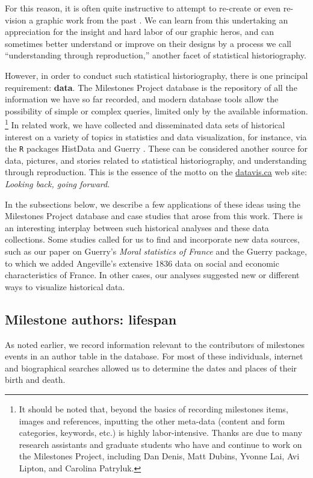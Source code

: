 For this reason, it is often quite instructive to attempt to re-create or even re-vision a graphic work from the past \citep{Friendly:02:Minard}. 
We can learn from this undertaking an appreciation for the insight and hard labor of our graphic heros, and can sometimes better understand 
or improve on their designs by a process we call ``understanding through reproduction,'' another facet of statistical historiography.



However, in order to conduct such statistical historiography, there is one principal requirement: \textbf{data}. 
The Milestones Project database is the repository of all the information we have so far recorded, and modern database tools 
allow the possibility of simple or complex queries, limited only by the available information.%
\footnote{It should be noted that, beyond the basics of recording milestones items, images and references, 
inputting the other meta-data (content and form categories, keywords, etc.) is highly labor-intensive. 
Thanks are due to many research assistants and graduate students who have and continue to work on the Milestones Project, 
including Dan Denis, Matt Dubins, Yvonne Lai, Avi Lipton, and Carolina Patryluk.}
In related work, we have collected and disseminated data sets of historical interest on a variety of topics in statistics and data visualization, 
for instance, via the \texttt{R} packages HistData \citep{HistData} and Guerry \citep{Guerry}. 
These can be considered another source for data, pictures, and stories related to statistical historiography, and understanding through reproduction. 
This is the essence of the motto on the \url{datavis.ca} web site: \emph{Looking back, going forward}.

In the subsections below, we describe a few applications of these ideas using the Milestones Project database and case studies 
that arose from this work. 
There is an interesting interplay between such historical analyses and these data collections. 
Some studies called for us to find and incorporate new data sources, such as our paper \citep{Friendly:2007:guerry} 
on Guerry's \emph{Moral statistics of France} and the Guerry package, to which we added Angeville's extensive 1836 data on social 
and economic characteristics of France. In other cases, our analyses suggested new or different ways to visualize historical data.

\subsection{Milestone authors: lifespan}\label{sec:lifespan}
As noted earlier, we record information relevant to the contributors of milestones events in an author table in the database. 
For most of these individuals, internet and biographical searches allowed us to determine the dates and places of their birth and death.

